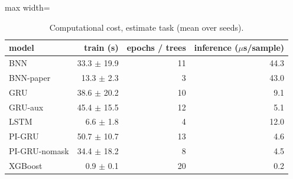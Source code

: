 \begin{table}[H]
\centering\small
\caption{Computational cost, estimate task (mean over seeds).}\label{tab:cost_estimate}
\begin{adjustbox}{max width=\textwidth}
\begin{tabular}{lrrr}
\toprule
model & train (s) & epochs / trees & inference ($\mu$s/sample) \\
\midrule
BNN & 33.3 $\pm$ 19.9 & 11 & 44.3 \\
BNN-paper & 13.3 $\pm$ 2.3 & 3 & 43.0 \\
GRU & 38.6 $\pm$ 20.2 & 10 & 9.1 \\
GRU-aux & 45.4 $\pm$ 15.5 & 12 & 5.1 \\
LSTM & 6.6 $\pm$ 1.8 & 4 & 12.0 \\
PI-GRU & 50.7 $\pm$ 10.7 & 13 & 4.6 \\
PI-GRU-nomask & 34.4 $\pm$ 18.2 & 8 & 4.5 \\
XGBoost & 0.9 $\pm$ 0.1 & 20 & 0.2 \\
\bottomrule
\end{tabular}
\end{adjustbox}
\end{table}
